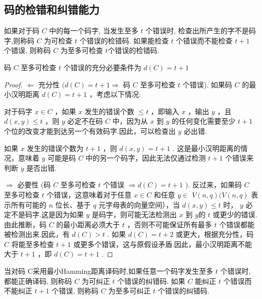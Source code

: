 \subsection{码的检错和纠错能力}
\begin{definition}
    如果对于码 $ C $ 中的每一个码字, 当发生至多 $ t $ 个错误时, 检查出所产生的字不是码字,则称码 $ C $ 为可检查 $ t $ 个错误的检错码. 如果能检查 $ t $ 个错误而不能检查 $ t+1 $ 个错误, 则称码 $ C $ 为至多可检查 $ t $个错误的检错码.
\end{definition}
\begin{theorem}
    码 $ C $ 至多可检查 $ t $ 个错误的充分必要条件为 $ d(C)=t+1 $
\end{theorem}
\begin{proof}
 $ \Leftarrow $ 充分性 $ (d(C)=t+1 \Rightarrow $ 码 $ C $ 至多可检查 $ t $ 个错误).
如果码 $ C $ 的最小汉明距离 $ d(C)=t+1 $ ，考虑以下情况:
 
对于码字 $ x \in C $ ，如果 $ x $ 发生的错误个数 $ \leq t $ ，即输入 $ x $ ，输出 $ y $ ，且 $ d(x, y) \leq t $ ，则 $ y $ 必定不在码 $ C $ 中，因为从 $ x $ 到 $ y $ 的任何变化需要至少 $ t+1 $ 个位的改变才能到达另一个有效码字.因此，可以检查出 $ y $ 必出错.

如果 $ x $ 发生的错误个数为 $ t+1 $ ，则 $ d(x, y)=t+1 $ . 这是最小汉明距离的情况，意味着 $ y $ 可能是码 $ C $ 中的另一个码字，因此无法仅通过检测 $ t+1 $ 个错误来判断 $ y $ 是否出错.

$ \Rightarrow $ 必要性 (码 $ C $ 至多可检查 $ t $ 个错误 $ \Rightarrow d(C)=t+1 $ ).
反过来，如果码 $ C $ 至多可检查 $ t $ 个错误，这意味着对于任意 $ x \in C $ 和任意 $ y \in $ $ V(n, q)(V(n, q) $ 表示所有可能的 $ n $ 位长、基于 $ q $ 元字母表的向量空间），当 $ d(x, y) \leq t $ 时， $ y $ 必定不是码字.这是因为如果 $ y $ 是码字，则可能无法检测出 $ x $ 到 $ y $的 $ t $ 或更少的错误.由此推断，码 $ C $ 的最小距离必须大于 $ t $ ，否则不可能保证所有最多 $ t $ 个错误都能被检测出来.因此，有 $ d(C)>t $ . 如果 $ d(C)=t+2 $ 或更大，根据充分性，码 $ C $ 将能至多检查 $ t+1 $ 或更多个错误，这与原假设矛盾.因此，最小汉明距离不能大于 $ t+1 $ ，即 $ d(C)=t+1 $ .

\end{proof}
\begin{definition}
   当对码 C采用最小Hamming距离译码时,如果任意一个码字发生至多 $ t $ 个错误时, 都能正确译码, 则称码 $ C $ 为可纠正 $ t $ 个错误的纠错码. 如果 $ C $ 能纠正 $ t $ 个错误而不能纠正 $ t+1 $ 个错误, 则称码 $ C $ 为至多可纠正 $ t $ 个错误的纠错码.
\end{definition}

